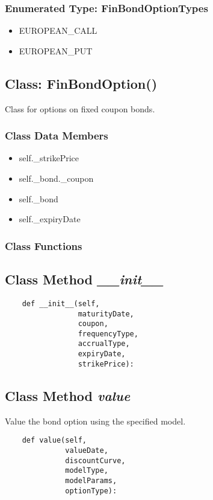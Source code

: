 \documentclass[twoside,11pt]{book}
\begin{document}
\subsubsection{Enumerated Type: FinBondOptionTypes}
\begin{itemize}
\item{EUROPEAN\_CALL}
\item{EUROPEAN\_PUT}
\end{itemize}

\subsection{Class: FinBondOption()}
Class for options on fixed coupon bonds. 

\subsubsection{Class Data Members}
\begin{itemize}
\item{self.\_strikePrice}
\item{self.\_bond.\_coupon}
\item{self.\_bond}
\item{self.\_expiryDate}
\end{itemize}

\subsubsection{Class Functions}

\subsection{Class Method {\it \_\_init\_\_}}


\begin{lstlisting}
    def __init__(self,
                 maturityDate, 
                 coupon,
                 frequencyType,
                 accrualType,
                 expiryDate, 
                 strikePrice):
\end{lstlisting}

\subsection{Class Method {\it value}}
Value the bond option using the specified model. 

\begin{lstlisting}
    def value(self,
              valueDate,
              discountCurve,
              modelType,
              modelParams,
              optionType):
\end{lstlisting}
\end{document}
